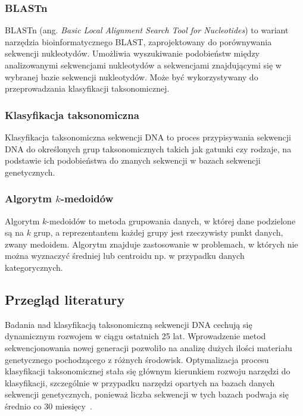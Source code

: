             \subsubsection{BLASTn}

            BLASTn (ang. \textit{Basic Local Alignment Search Tool for Nucleotides}) to wariant narzędzia bioinformatycznego BLAST, zaprojektowany do porównywania sekwencji nukleotydów. Umożliwia wyszukiwanie podobieństw między analizowanymi sekwencjami nukleotydów a sekwencjami znajdującymi się w wybranej bazie sekwencji nukleotydów. Może być wykorzystywany do przeprowadzania klasyfikacji taksonomicznej.

        \subsubsection{Klasyfikacja taksonomiczna}

            Klasyfikacja taksonomiczna sekwencji DNA to proces przypisywania sekwencji DNA do określonych grup taksonomicznych takich jak gatunki czy rodzaje, na podstawie ich podobieństwa do znanych sekwencji w bazach sekwencji genetycznych.

        \subsubsection{Algorytm $k$-medoidów}

            Algorytm $k$-medoidów to metoda grupowania danych, w której dane podzielone są na $k$ grup, a reprezentantem każdej grupy jest rzeczywisty punkt danych, zwany medoidem. Algorytm znajduje zastosowanie w problemach, w których nie można wyznaczyć średniej lub centroidu np. w przypadku danych kategorycznych.

    \subsection{Przegląd literatury}

        Badania nad klasyfikacją taksonomiczną sekwencji DNA cechują się dynamicznym rozwojem w ciągu ostatnich 25 lat. Wprowadzenie metod sekwencjonowania nowej generacji pozwoliło na analizę dużych ilości materiału genetycznego pochodzącego z różnych środowisk. Optymalizacja procesu klasyfikacji taksonomicznej stała się głównym kierunkiem rozwoju narzędzi do klasyfikacji, szczególnie w przypadku narzędzi opartych na bazach danych sekwencji genetycznych, ponieważ liczba sekwencji w tych bazach podwaja się średnio co 30 miesięcy~\cite{Benson:2008}.

